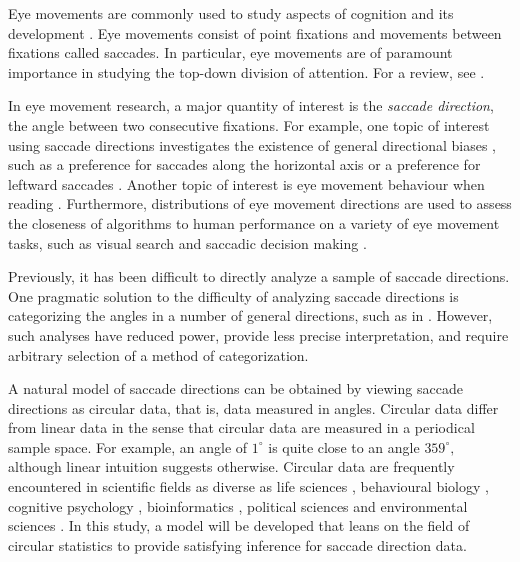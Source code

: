 
Eye movements are commonly used to study aspects of cognition and its development \citep{itti2001computational, henderson2003human}. Eye movements consist of point fixations and movements between fixations called saccades. In particular, eye movements are of paramount importance in studying the top-down division of attention. For a review, see \citet{rayner2009eye}.

In eye movement research, a major quantity of interest is the \textit{saccade direction}, the angle between two consecutive fixations. For example, one topic of interest using saccade directions investigates the existence of general directional biases \citep{tatler2009prominence}, such as a preference for saccades along the horizontal axis \citep{foulsham2008turning} or a preference for leftward saccades \citep{foulsham2013leftward}. Another topic of interest is eye movement behaviour when reading \citep{rayner2009eye}. Furthermore, distributions of eye movement directions are used to assess the closeness of algorithms to human performance on a variety of eye movement tasks, such as visual search \citep{najemnik2008eye} and saccadic decision making \citep{tatler2017latest, engbert2015spatial, le2016introducing}.

Previously, it has been difficult to directly analyze a sample of saccade directions. One pragmatic solution to the difficulty of analyzing saccade directions is categorizing the angles in a number of general directions, such as in \citet{foulsham2008turning}. However, such analyses have reduced power, provide less precise interpretation, and require arbitrary selection of a method of categorization.

A natural model of saccade directions can be obtained by viewing saccade directions as circular data, that is, data measured in angles. Circular data differ from linear data in the sense that circular data are measured in a periodical sample space. For example, an angle of $1^{\circ}$ is quite close to an angle $359^{\circ},$ although linear intuition suggests otherwise. Circular data are frequently encountered in scientific fields as diverse as life sciences \citep{mardianew}, behavioural biology \citep{bulbert2015danger}, cognitive psychology \citep{kaas2006haptic}, bioinformatics \citep{mardia2008multivariate}, political sciences \citep{gill2010} and environmental sciences \citep{arnold2006recent}. In this study, a model will be developed that leans on the field of circular statistics \citep{fisher1995statistical, mardia2009directional, pewsey2013circular} to provide satisfying inference for saccade direction data.

